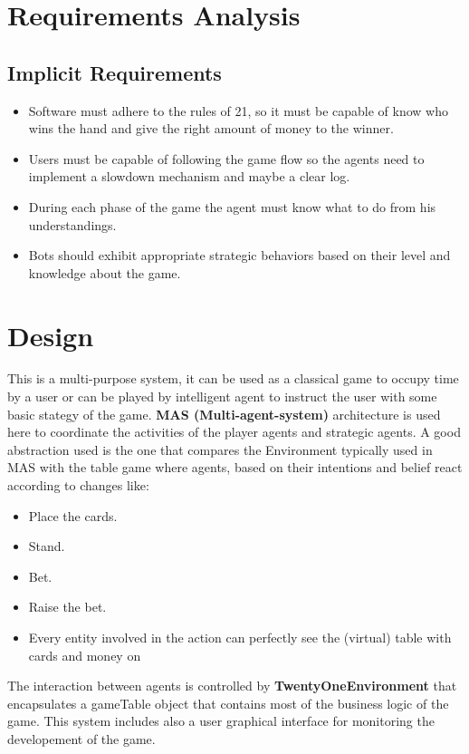 \chapter{Requirements Analysis}

\section{Implicit Requirements}
\begin{itemize}
   \item Software must adhere to the rules of 21, so it must be capable of know who wins the hand and give the right amount of money to the winner.
   \item Users must be capable of following the game flow so the agents need to implement a slowdown mechanism and maybe a clear log.
   \item During each phase of the game the agent must know what to do from his understandings.
   \item Bots should exhibit appropriate strategic behaviors based on their level and knowledge about the game.
\end{itemize}

\chapter{Design}

This is a multi-purpose system, it can be used as a classical game to occupy time by a user or can be played by intelligent agent to instruct the user with some basic stategy of the game. \textbf{MAS (Multi-agent-system)} architecture is used here to coordinate the activities of the player agents and strategic agents. A good abstraction used is the one that compares the Environment typically used in MAS with the table game where agents, based on their intentions and belief react according to changes like: 
\begin{itemize}
    \item Place the cards.
    \item Stand.
    \item Bet.
    \item Raise the bet.
    \item Every entity involved in the action can perfectly see the (virtual) table with cards and money on
 \end{itemize}

The interaction between agents is controlled by \textbf{TwentyOneEnvironment} that encapsulates a gameTable object that contains most of the business logic of the game. This system includes also a user graphical interface for monitoring the developement of the game.

